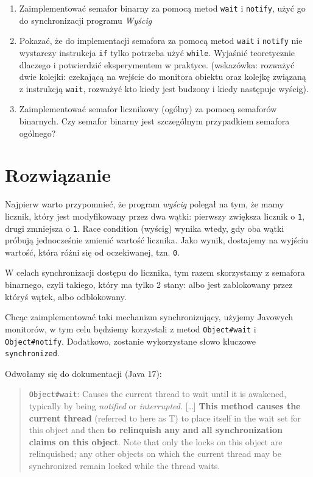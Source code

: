 \documentclass[11pt]{article}
\begin{document}
\begin{enumerate}
\def\labelenumi{\arabic{enumi}.}
\item
  Zaimplementować semafor binarny za pomocą metod \texttt{wait} i
  \texttt{notify}, użyć go do synchronizacji programu \emph{Wyścig}
\item
  Pokazać, że do implementacji semafora za pomocą metod \texttt{wait} i
  \texttt{notify} nie wystarczy instrukcja \texttt{if} tylko potrzeba
  użyć \texttt{while}. Wyjaśnić teoretycznie dlaczego i potwierdzić
  eksperymentem w praktyce. (wskazówka: rozważyć dwie kolejki: czekającą
  na wejście do monitora obiektu oraz kolejkę związaną z instrukcją
  \texttt{wait}, rozważyć kto kiedy jest budzony i kiedy następuje
  wyścig).
\item
  Zaimplementować semafor licznikowy (ogólny) za pomocą semaforów
  binarnych. Czy semafor binarny jest szczególnym przypadkiem semafora
  ogólnego?
\end{enumerate}

    \hypertarget{rozwiux105zanie}{%
\section{Rozwiązanie}\label{rozwiux105zanie}}

Najpierw warto przypomnieć, że program \emph{wyścig} polegał na tym, że
mamy licznik, który jest modyfikowany przez dwa wątki: pierwszy zwiększa
licznik o \texttt{1}, drugi zmniejsza o \texttt{1}. Race condition
(wyścig) wynika wtedy, gdy oba wątki próbują jednocześnie zmienić
wartość licznika. Jako wynik, dostajemy na wyjściu wartość, która różni
się od oczekiwanej, tzn. \texttt{0}.

W celach synchronizacji dostępu do licznika, tym razem skorzystamy z
semafora binarnego, czyli takiego, który ma tylko 2 stany: albo jest
zablokowany przez któryś wątek, albo odblokowany.

Chcąc zaimplementować taki mechanizm synchronizujący, użyjemy Javowych
monitorów, w tym celu będziemy korzystali z metod \texttt{Object\#wait}
i \texttt{Object\#notify}. Dodatkowo, zostanie wykorzystane słowo
kluczowe \texttt{synchronized}.

Odwołamy się do dokumentacji (Java 17):

\begin{quote}
\texttt{Object\#wait}: Causes the current thread to wait until it is
awakened, typically by being \emph{notified} or \emph{interrupted}.
{[}\ldots{]} \textbf{This method causes the current thread} (referred to
here as T) to place itself in the wait set for this object and then
\textbf{to relinquish any and all synchronization claims on this
object}. Note that only the locks on this object are relinquished; any
other objects on which the current thread may be synchronized remain
locked while the thread waits.
\end{quote}
\end{document}
